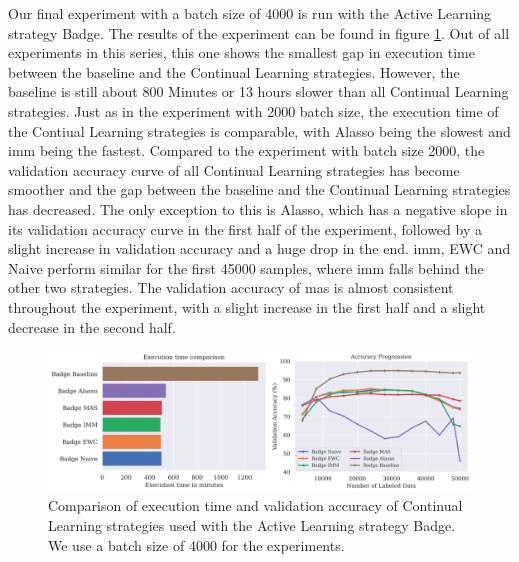 Our final experiment with a batch size of 4000 is run with the Active Learning strategy Badge. The results of the experiment can be found in figure \ref{fig:Evaluation:Results:CAL:Badge4000}. Out of all experiments in this series, this one shows the
smallest gap in execution time between the baseline and the Continual Learning strategies. However, the baseline is still about 800 Minutes or 13 hours slower than all Continual Learning strategies. Just as in the experiment with 2000 batch size, the
execution time of the Contiual Learning strategies is comparable, with Alasso being the slowest and \gls{imm} being the fastest. Compared to the experiment with batch size 2000, the validation accuracy curve of all Continual Learning strategies has become smoother 
and the gap between the baseline and the Continual Learning strategies has decreased. The only exception to this is Alasso, which has a negative slope in its validation accuracy curve in the first half of the experiment, followed by a slight increase in 
validation accuracy and a huge drop in the end. \gls{imm}, EWC and Naive perform similar for the first 45000 samples, where \gls{imm} falls behind the other two strategies. The validation accuracy of \gls{mas} is almost consistent throughout the experiment, with a slight
increase in the first half and a slight decrease in the second half. \par

\begin{figure}[h]
    \centering
    \includegraphics[width=\linewidth]{images/results_CAL/Badge_CAL_4000b.png}
    \caption[Continual Active Learning Badge 4000 batch size]{Comparison of execution time and validation accuracy of Continual Learning strategies used with the Active Learning strategy
    Badge. We use a batch size of 4000 for the experiments.}
    \label{fig:Evaluation:Results:CAL:Badge4000}
\end{figure}

